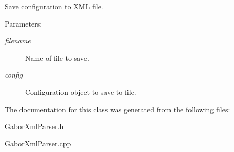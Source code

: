 Save configuration to XML file. \begin{Desc}
\item[Parameters:]
\begin{description}
\item[{\em filename}]Name of file to save. \item[{\em config}]Configuration object to save to file. \end{description}
\end{Desc}


The documentation for this class was generated from the following files:\begin{CompactItemize}
\item 
GaborXmlParser.h\item 
GaborXmlParser.cpp\end{CompactItemize}
